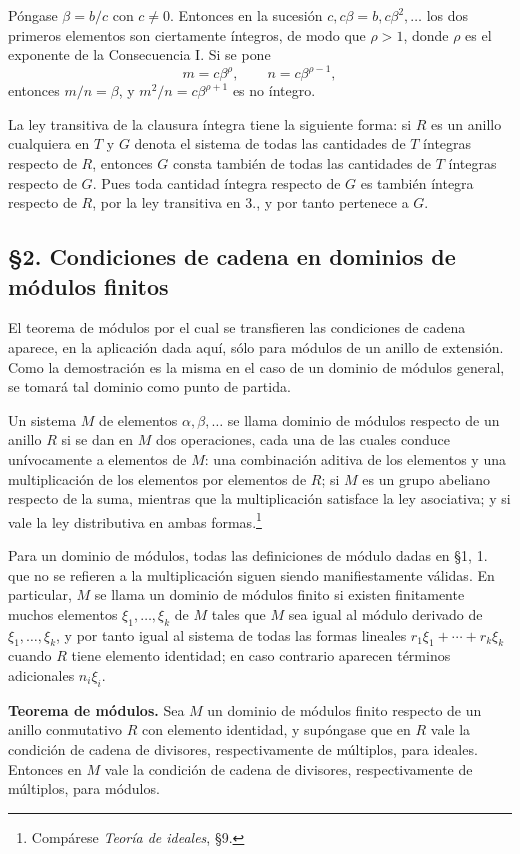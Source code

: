 \documentclass[11pt]{article}
\begin{document}
Póngase $\beta=b/c$ con $c\ne0$. Entonces en la sucesión $c,c\beta=b,c\beta^2,\ldots$ los dos primeros elementos son ciertamente íntegros, de modo que $\rho>1$, donde $\rho$ es el exponente de la Consecuencia I. Si se pone
\[
        m=c\beta^\rho,\qquad n=c\beta^{\rho-1},
\]
entonces $m/n=\beta$, y $m^2/n=c\beta^{\rho+1}$ es no íntegro.

La ley transitiva de la clausura íntegra tiene la siguiente forma: si $R$ es un anillo cualquiera en $T$ y $G$ denota el sistema de todas las cantidades de $T$ íntegras respecto de $R$, entonces $G$ consta también de todas las cantidades de $T$ íntegras respecto de $G$. Pues toda cantidad íntegra respecto de $G$ es también íntegra respecto de $R$, por la ley transitiva en 3., y por tanto pertenece a $G$.

\subsection*{§2. Condiciones de cadena en dominios de módulos finitos}

El teorema de módulos por el cual se transfieren las condiciones de cadena aparece, en la aplicación dada aquí, sólo para módulos de un anillo de extensión. Como la demostración es la misma en el caso de un dominio de módulos general, se tomará tal dominio como punto de partida.

Un sistema $M$ de elementos $\alpha,\beta,\ldots$ se llama dominio de módulos respecto de un anillo $R$ si se dan en $M$ dos operaciones, cada una de las cuales conduce unívocamente a elementos de $M$: una combinación aditiva de los elementos y una multiplicación de los elementos por elementos de $R$; si $M$ es un grupo abeliano respecto de la suma, mientras que la multiplicación satisface la ley asociativa; y si vale la ley distributiva en ambas formas.\footnote{Compárese \emph{Teoría de ideales}, §9.}

Para un dominio de módulos, todas las definiciones de módulo dadas en §1, 1. que no se refieren a la multiplicación siguen siendo manifiestamente válidas. En particular, $M$ se llama un dominio de módulos finito si existen finitamente muchos elementos $\xi_1,\ldots,\xi_k$ de $M$ tales que $M$ sea igual al módulo derivado de $\xi_1,\ldots,\xi_k$, y por tanto igual al sistema de todas las formas lineales $r_1\xi_1+\cdots+r_k\xi_k$ cuando $R$ tiene elemento identidad; en caso contrario aparecen términos adicionales $n_i\xi_i$.

\medskip
\noindent\textbf{Teorema de módulos.} Sea $M$ un dominio de módulos finito respecto de un anillo conmutativo $R$ con elemento identidad, y supóngase que en $R$ vale la condición de cadena de divisores, respectivamente de múltiplos, para ideales. Entonces en $M$ vale la condición de cadena de divisores, respectivamente de múltiplos, para módulos.
\end{document}
